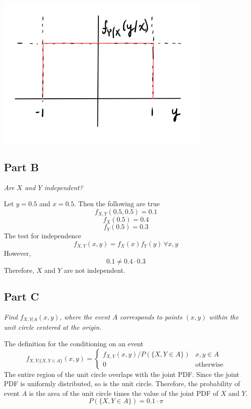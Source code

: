 \documentclass{article}
\begin{document}
\begin{center}
    \includegraphics[scale=0.5]{Images/P1Avi.PNG}
\end{center}

\subsection*{Part B}

\textit{Are $X$ and $Y$ independent?}

\bigbreak

Let $y = 0.5$ and $x = 0.5$. Then the following are true
$$ f_{X,Y}(0.5, 0.5) = 0.1 $$
$$ f_X(0.5) = 0.4 $$
$$ f_Y(0.5) = 0.3 $$
The test for independence
$$ f_{X,Y}(x, y) = f_X(x) f_Y(y)\, \forall x, y $$
However,
$$ 0.1 \neq 0.4 \cdot 0.3 $$
Therefore, $X$ and $Y$ are not independent.

\subsection*{Part C}

\textit{Find $f_{X,Y|A}(x, y)$, where the event $A$ corresponds to points
$(x, y)$ within the unit circle centered at the origin.}

\bigbreak

The definition for the conditioning on an event
$$ f_{X,Y|\{X,Y \in A\}}(x, y) = \begin{cases}
    f_{X,Y}(x, y) / P(\{X, Y \in A\}) & x, y \in A \\
    0 & \mathrm{otherwise}
\end{cases} $$
The entire region of the unit circle overlaps with the joint PDF. Since the
joint PDF is uniformly distributed, so is the unit circle. Therefore, the
probability of event $A$ is the area of the unit circle times the value of
the joint PDF of $X$ and $Y$.
$$ P(\{X, Y \in A \}) = 0.1 \cdot \pi $$
\end{document}

